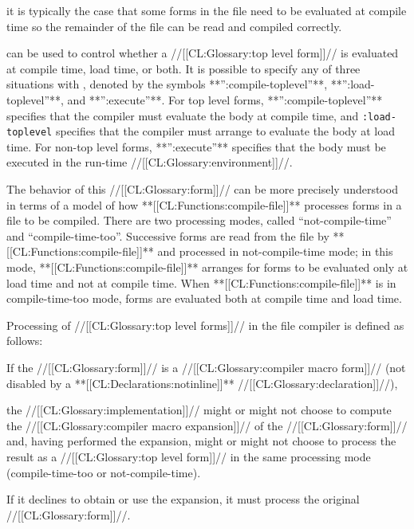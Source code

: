 it is typically the case that some forms in the file need to be evaluated at compile time so the remainder of the file can be read and compiled correctly.

 can be used to control whether a //[[CL:Glossary:top level form]]// is evaluated at compile time, load time, or both.  It is possible to specify any of three situations with , denoted by the symbols **'':compile-toplevel''**, **'':load-toplevel''**, and **'':execute''**.  For top level   forms, **'':compile-toplevel''** specifies that the compiler must evaluate the body at compile time, and {\tt :load-toplevel} specifies that the compiler must arrange to evaluate the body at load time. For non-top level  forms, **'':execute''** specifies that the body must be executed in the run-time //[[CL:Glossary:environment]]//.

The behavior of this //[[CL:Glossary:form]]// can be more precisely understood in terms of a model of how **[[CL:Functions:compile-file]]** processes forms in a file to be compiled. There are two processing modes, called ``not-compile-time'' and ``compile-time-too''.
  Successive forms are read from the file by **[[CL:Functions:compile-file]]** and processed in not-compile-time mode; in this mode,  **[[CL:Functions:compile-file]]** arranges for forms to be evaluated only at load time and not at compile time.  When **[[CL:Functions:compile-file]]** is in compile-time-too mode, forms are evaluated both at compile time and load time.

 

Processing of //[[CL:Glossary:top level forms]]// in the file compiler is defined as follows:

\beginlist {}
  If the //[[CL:Glossary:form]]// is a //[[CL:Glossary:compiler macro form]]// (not disabled by a **[[CL:Declarations:notinline]]** //[[CL:Glossary:declaration]]//),

the //[[CL:Glossary:implementation]]// might or might not choose to compute the //[[CL:Glossary:compiler macro expansion]]// of the //[[CL:Glossary:form]]// and, having performed the expansion, might or might not choose to process the result as a //[[CL:Glossary:top level form]]// in the same processing mode (compile-time-too or not-compile-time).

If it declines to obtain or use the expansion, it must process the original //[[CL:Glossary:form]]//.

